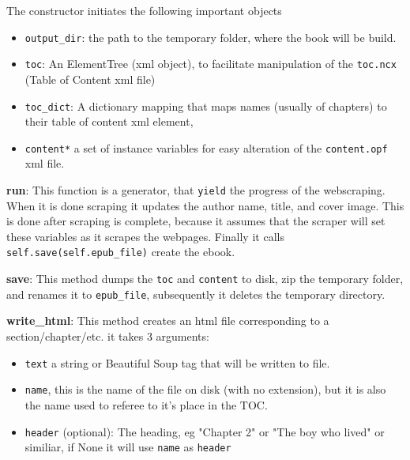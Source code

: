 \documentclass[]{report}   %
\begin{document}
The constructor initiates the following important objects
\begin{itemize}
	\item \texttt{output\_dir}: the path to the temporary folder, where the book will be build.
	\item \texttt{toc}: An ElementTree (xml object), to facilitate manipulation of the \texttt{toc.ncx} (Table of Content xml file)
	\item \texttt{toc\_dict}: A dictionary mapping that maps names (usually of chapters) to their table of content xml element, 
	\item \texttt{content*} a set of instance variables for easy alteration of the \texttt{content.opf} xml file.
\end{itemize}


\textbf{run}: This function is a generator, that \texttt{yield} the progress of
the webscraping. When it is done scraping it updates the author name, title,
and cover image. This is done after scraping is complete,
because it assumes that the scraper will set these variables as it scrapes the
webpages. Finally it calls \texttt{self.save(self.epub\_file)} create the ebook.



\textbf{save}: This method dumps the \texttt{toc} and \texttt{content} to disk, zip the temporary folder, and renames it to \texttt{epub\_file}, subsequently it deletes the temporary directory.

\textbf{write\_html}: This method creates an html file corresponding to a section/chapter/etc. it takes 3 arguments:
\begin{itemize}
	\item \texttt{text} a string or Beautiful Soup tag that will be written to file.
	\item \texttt{name}, this is the name of the file on disk (with no extension), but it is also the name used to referee to it's place in the TOC. 
	\item \texttt{header} (optional): The heading, eg "Chapter 2" or "The boy who lived" or similiar, if None it will use \texttt{name} as \texttt{header}
\end{itemize}
\end{document}

